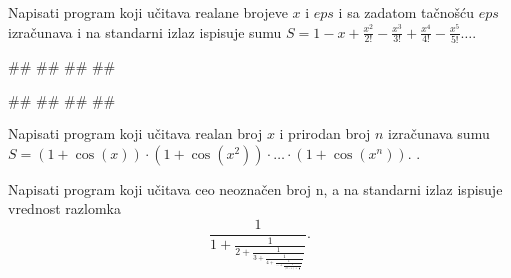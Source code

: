 \begin{Exercise}[difficulty=1, label=p1.3_13]
Napisati program koji učitava realane brojeve $x$ i $eps$ i sa zadatom
tačnošću $eps$ izračunava i na standarni izlaz ispisuje sumu
$S=1-x+\frac{x^2}{2!}-\frac{x^3}{3!}+\frac{x^4}{4!}-\frac{x^5}{5!}\ldots$. 
  
\begin{miditest}
\begin{upotreba}{1}
#\naslovInt#
##
##
##
\end{upotreba}
\end{miditest}
\begin{miditest}
\begin{upotreba}{2}
#\naslovInt#
##
##
##
\end{upotreba}
\end{miditest}
\end{Exercise}
\begin{Answer}[ref=p1.3_13]
\end{Answer}

\begin{Exercise}[label=p1.7_] 
Napisati program koji učitava realan broj $x$ i prirodan broj $n$
izračunava sumu $S = (1 + \cos(x))\cdot(1 + \cos(x^2))\cdot \ldots
\cdot(1 + \cos(x^n))$. .  
\end{Exercise}
\begin{Answer}[ref=p1.7_]
\end{Answer}


\begin{Exercise}[difficulty=1, label=p1.7_] 
Napisati program koji učitava ceo neoznačen broj n, a na standarni
izlaz ispisuje vrednost razlomka\\
	\[
		\frac{1}{1 + \frac{1}{2 + \frac{1}{3 + \frac{1}{4 + \frac{1}{\ldots + \frac{1}{(n-1) + \frac{1}{n}}}}}}}.
	\]
 \\
\end{Exercise}
\begin{Answer}[ref=p1.7_]
\end{Answer}

